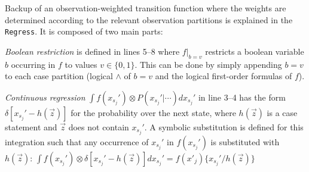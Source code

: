 \documentclass{article}
\begin{document}
%
%

Backup of an observation-weighted transition function where the weights are determined according to the relevant observation partitions is explained in the \texttt{Regress}. It is composed of two main parts:

\emph{Boolean restriction} is defined in lines 5--8 where $f|_{b=v}$ restricts a boolean variable $b$ occurring in $f$ to values $v \in \{ 0,1 \}$. This can be done by simply appending $b=v$ to each case partition (logical $\wedge$ of $b=v$ and the logical first-order formulas of $f$). 

\emph{Continuous regression} $\int f(x_{s_j}') \otimes P(x_{s_j}'|\cdots) dx_{s_j}'$ in line 3--4 has the form $\delta[x_{s_j}' - h(\vec{z})]$ for the probability over the next state, where $h(\vec{z})$ is a case statement and $\vec{z}$ does not contain
$x_{s_j}'$.  A symbolic substitution is defined for this integration such that any occurrence of $x_{s_j}'$ in $f(x_{s_j}')$ is substituted with $h(\vec{z})$: 
$\int f(x_{s_j}') \otimes \delta[x_{s_j}' - h(\vec{z})] dx_{s_j}' = f(x'_j) \{ x_{s_j}' / h(\vec{z}) \}$
\end{document}
